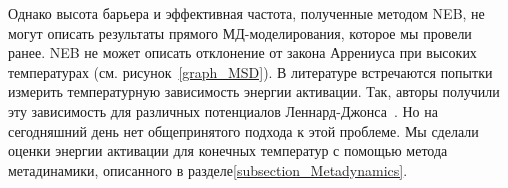 \documentclass[master,14pt,subf,href,colorlinks=true
]{disser}
\begin{document}
Однако высота барьера и эффективная частота, полученные методом NEB, не могут описать результаты прямого МД-моделирования, которое мы провели ранее. NEB не может описать отклонение от закона Аррениуса при высоких температурах (см. рисунок~\ref{graph_MSD}).
В литературе встречаются попытки измерить температурную зависимость энергии активации. Так, авторы получили эту зависимость для различных потенциалов Леннард-Джонса~\cite{De_Lorenzi_1987,Sato_2010}. Но на сегодняшний день нет общепринятого подхода к этой проблеме.
Мы сделали оценки энергии активации для конечных температур с помощью метода метадинамики, описанного в разделе\ref{subsection_Metadynamics}.
\end{document}
